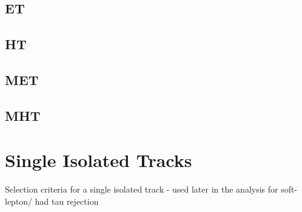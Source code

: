\subsection{ET}
\subsection{HT}
\subsection{MET}
\subsection{MHT}

\section{Single Isolated Tracks}  %
\label{sec:objects_sit}
Selection criteria for a single isolated track - used later in the analysis for soft-lepton/
had tau rejection